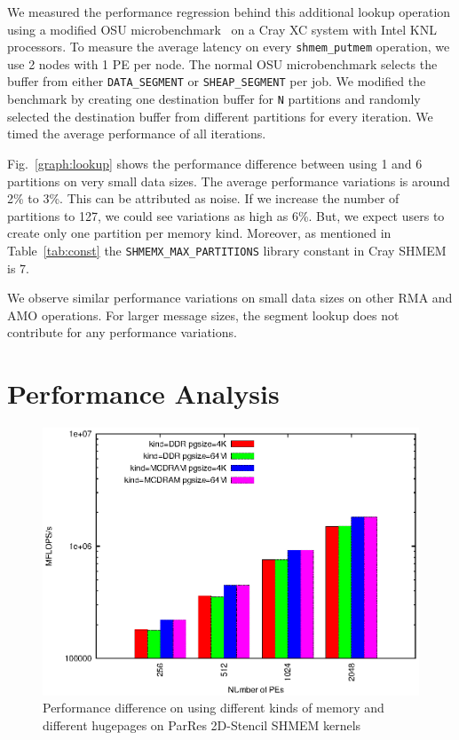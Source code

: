We measured the performance regression behind this additional lookup
operation using a modified OSU microbenchmark~\cite{osu-mb}
on a Cray XC system with Intel KNL processors. To measure the average
latency on every \texttt{shmem\_putmem} operation, we use 2 nodes
with 1 PE per node.
The normal OSU microbenchmark selects the buffer from either
\texttt{DATA\_SEGMENT} or \texttt{SHEAP\_SEGMENT}
per job. We modified the benchmark by creating
one destination buffer for \texttt{N} partitions and randomly selected
the destination buffer from different partitions for every iteration.
We timed the average performance of all iterations.%

Fig.~\ref{graph:lookup} shows the
performance difference between using 1 and 6 partitions on very small
data sizes. The average performance variations is around 2\% to
3\%. This can be attributed as noise. If we increase
the number of partitions to 127, we could see variations as high
as 6\%. But, we expect users to create only one partition per
memory kind.
Moreover, as mentioned in
Table~\ref{tab:const} the \texttt{SHMEMX\_MAX\_PARTITIONS} library
constant in Cray SHMEM is 7.

We observe similar performance variations on small data sizes on other
RMA and AMO operations. For larger message sizes, the segment lookup
does not contribute for any performance variations.

\section{Performance Analysis}
\label{src:perf}

\begin{figure}[ht!]
    \vspace{-30pt}
    \centering
    \includegraphics[width=\linewidth]{graph/2d-stencil.eps}
    \caption{Performance difference on using different kinds of memory
    and different hugepages on ParRes 2D-Stencil SHMEM kernels}
    \label{graph:2dstencil}
    \vspace{-20pt}
\end{figure}

